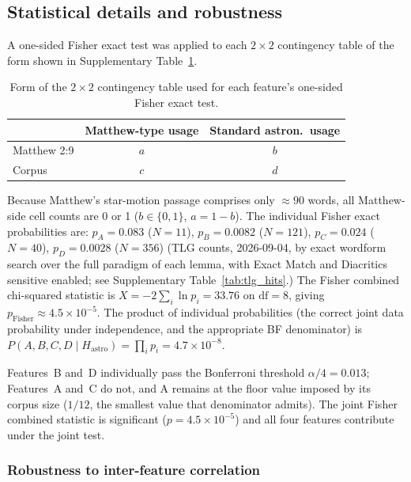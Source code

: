 \documentclass[11pt,a4paper]{article}
\begin{document}
\subsection{Statistical details and robustness}\label{subsec:stats_si}

A one-sided Fisher exact test was applied to each $2\times2$ contingency
table of the form shown in Supplementary Table~\ref{tab:contingency}.

\begin{table}[htbp]
\centering
\caption{Form of the $2\times2$ contingency table used for each feature's one-sided Fisher exact test.}\label{tab:contingency}
\begin{tabular}{@{}lcc@{}}
\toprule
 & Matthew-type usage & Standard astron.\ usage \\
\midrule
Matthew 2:9 & $a$ & $b$ \\
Corpus & $c$ & $d$ \\
\bottomrule
\end{tabular}
\end{table}

Because Matthew's star-motion passage comprises only $\approx\!90$ words,
all Matthew-side cell counts are 0 or 1 ($b \in \{0,1\}$, $a = 1-b$).
The individual Fisher exact probabilities are:
$p_A = 0.083$ ($N=11$), $p_B = 0.0082$ ($N=121$), $p_C = 0.024$ ($N=40$),
$p_D = 0.0028$ ($N=356$)
(TLG counts, 2026-09-04, by exact wordform search over the full paradigm of
each lemma, with \textsf{Exact Match} and \textsf{Diacritics sensitive}
enabled; see Supplementary Table~\ref{tab:tlg_hits}.)
The Fisher combined chi-squared statistic is
$X = -2\sum_i \ln p_i = 33.76$ on $\mathrm{df}=8$, giving
$p_\text{Fisher} \approx 4.5\times10^{-5}$.
The product of individual probabilities (the correct joint data probability
under independence, and the appropriate BF denominator) is
$P(A,B,C,D \mid H_\text{astro}) = \prod_i p_i = 4.7\times10^{-8}$.

Features~B and~D individually pass the Bonferroni threshold
$\alpha/4 = 0.013$; Features~A and~C do not, and A remains at the floor value
imposed by its corpus size ($1/12$, the smallest value that denominator
admits). The joint Fisher combined statistic is significant
($p = 4.5\times10^{-5}$) and all four features contribute under the joint
test.

\subsubsection*{Robustness to inter-feature correlation}
\end{document}
